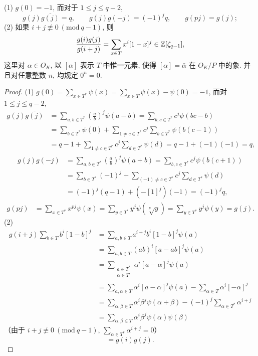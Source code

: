 \begin{theorem}\label{thm:9.5}
(1) $g(0)=-1$, 而对于 $1\leqslant j\leqslant q-2$,
\[
  g(j)\overline{g(j)}=q,\qquad g(j)g(-j)=(-1)^jq,\qquad g(pj)=g(j);
\]
(2) 如果 $i+j\not\equiv 0\ (\mathrm{mod}\ q-1)$, 则
\[
  \frac{g(i)g(j)}{g(i+j)}=\sum_{x\in T}x^i[1-x]^j\in\mathbb{Z}[\zeta_{q-1}],
\]
这里对 $\alpha\in O_K$, 以 $[\alpha]$ 表示 $T$ 中惟一元素, 使得 $[\alpha]=\bar{\alpha}$ 在 $O_K/P$ 中的象. 并且对任意整数 $n$, 均规定 $0^n=0$.
\end{theorem}

\begin{proof}
(1) $g(0)=\sum_{x\in T^*}\psi(x)=\sum_{x\in T}\psi(x)-\psi(0)=-1$, 而对 $1\leqslant j\leqslant q-2$,
\begin{align*}
  g(j)\overline{g(j)}&=\sum_{a,b\in T^*}\left(\frac{a}{b}\right)^j\psi(a-b)
  =\sum_{b,c\in T^*}c^j\psi(bc-b)\\
  &=\sum_{b\in T^*}\psi(0)+\sum_{1\neq c\in T^*}c^j\sum_{b\in T^*}\psi(b(c-1))\\
  &=q-1+\sum_{1\neq c\in T^*}c^j\sum_{d\in T^*}\psi(d)
  =q-1+(-1)(-1)=q,
\end{align*}
\begin{align*}
  g(j)g(-j)&=\sum_{a,b\in T^*}\left(\frac{a}{b}\right)^j\psi(a+b)
  =\sum_{b,c\in T^*}c^j\psi(b(c+1))\\
  &=\sum_{b\in T^*}(-1)^j+\sum_{(-1)\neq c\in T^*}c^j\sum_{d\in T^*}\psi(d)\\
  &=(-1)^j(q-1)+(-[1]^j)(-1)=(-1)^jq,
\end{align*}
\begin{align*}
  g(pj)&=\sum_{x\in T^*}x^{pj}\psi(x)
  =\sum_{y\in T^*}y^j\psi\left(\sqrt[p]{y}\right)
  =\sum_{y\in T^*}y^j\psi(y)=g(j).
\end{align*}
(2)
\begin{align*}
  g(i+j)\sum_{b\in T}b^i[1-b]^j&=\sum_{a,b\in T}a^{i+j}b^i[1-b]^j\psi(a)\\
  &=\sum_{a,b\in T}(ab)^i[a-ab]^j\psi(a)\\
  &=\sum_{\substack{a\in T^*\\ \alpha\in T}}\alpha^i[a-\alpha]^j\psi(a)\\
  &=\sum_{a,\alpha\in T}\alpha^i[a-\alpha]^j\psi(a)-\sum_{\alpha\in T}\alpha^i[-\alpha]^j\\
  &=\sum_{\alpha,\beta\in T}\alpha^i\beta^j\psi(\alpha+\beta)-(-1)^j\sum_{\alpha\in T^*}\alpha^{i+j}\\
  &=\sum_{\alpha,\beta\in T}\alpha^i\beta^j\psi(\alpha)\psi(\beta)
\end{align*}
（由于 $i+j\not\equiv 0\ (\mathrm{mod}\ q-1)$, $\sum_{\alpha\in T^*}\alpha^{i+j}=0$）
\[
  =g(i)g(j).
\]
\end{proof}

